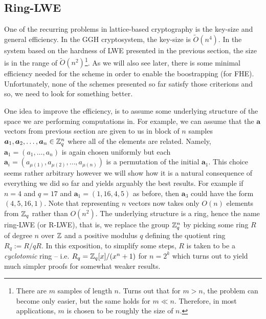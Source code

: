
\subsection{Ring-LWE}\label{ring-lwe}
One of the recurring problems in lattice-based cryptography is the key-size and general efficiency. In the GGH cryptosystem, the key-size is $\tilde{O}(n^4)$. In the system based on the hardness of LWE presented in the previous section, the size is in the range of $\tilde{O}(n^2)$\footnote{There are $m$ samples of length $n$. Turns out that for $m > n$, the problem can become only easier, but the same holds for $m \ll n$. Therefore, in most applications, $m$ is chosen to be roughly the size of $n$.}. As we will also see later, there is some minimal efficiency needed for the scheme in order to enable the boostrapping (for FHE). Unfortunately, none of the schemes presented so far satisfy those criterions and so, we need to look for something better.

One idea to improve the efficiency, is to assume some underlying structure of the space we are performing computations in. For example, we can assume that the $\bm{a}$ vectors from previous section are given to us in block of $n$ samples $\boldsymbol{a}_1, \boldsymbol{a}_2, \dots, \boldsymbol{a}_n \in \mathbb{Z}_q^n$ where all of the elements are related. Namely, $\bm{a}_1 = (a_1, \dots, a_n)$ is again chosen uniformly but each $\bm{a}_i = (a_{\mu(1)}, a_{\mu(2)}, \ldots, a_{\mu(n)})$ is a permutation of the initial $\bm{a}_1$. This choice seems rather arbitrary however we will show how it is a natural consequence of everything we did so far and yields arguably the best results. For example if $n = 4$ and $q = 17$ and $\bm{a}_1 = (1, 16, 4, 5)$ as before, then $\bm{a}_3$ could have the form $(4, 5, 16, 1)$. Note that representing $n$ vectors now takes only $O(n)$ elements from $\mathbb{Z}_q$ rather than $O(n^2)$. The underlying structure is a ring, hence the name ring-LWE (or R-LWE), that is, we replace the group $\mathbb{Z}_q^n$ by picking some ring $R$ of degree $n$ over $\mathbb{Z}$ and a positive modulus $q$ defining the quotient ring $R_q := R/qR$. In this exposition, to simplify some steps, $R$ is taken to be a \textit{cyclotomic} ring -- i.e. $R_q = \mathbb{Z}_q[x]/ (x^n + 1 )$ for $n = 2^k$ which turns out to yield much simpler proofs for somewhat weaker results.

